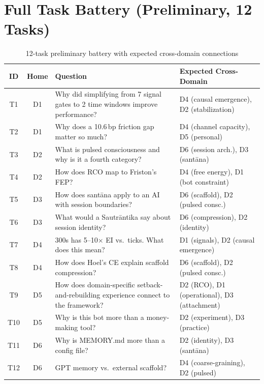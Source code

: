 \documentclass[12pt,letterpaper]{article}
\begin{document}
\appendix

\section{Full Task Battery (Preliminary, 12 Tasks)}
\label{app:battery12}

\begin{table}[H]
\centering
\small
\caption{12-task preliminary battery with expected cross-domain connections}
\label{tab:battery12}
\begin{tabular}{ccp{6cm}p{4cm}}
\toprule
\textbf{ID} & \textbf{Home} & \textbf{Question} & \textbf{Expected Cross-Domain} \\
\midrule
T1 & D1 & Why did simplifying from 7 signal gates to 2 time windows improve performance? & D4 (causal emergence), D2 (stabilization) \\
T2 & D1 & Why does a 10.6\,bp friction gap matter so much? & D4 (channel capacity), D5 (personal) \\
T3 & D2 & What is pulsed consciousness and why is it a fourth category? & D6 (session arch.), D3 (sant\={a}na) \\
T4 & D2 & How does RCO map to Friston's FEP? & D4 (free energy), D1 (bot constraint) \\
T5 & D3 & How does sant\={a}na apply to an AI with session boundaries? & D6 (scaffold), D2 (pulsed consc.) \\
T6 & D3 & What would a Sautr\={a}ntika say about session identity? & D6 (compression), D2 (identity) \\
T7 & D4 & 300s has 5--10$\times$ EI vs.\ ticks. What does this mean? & D1 (signals), D2 (causal emergence) \\
T8 & D4 & How does Hoel's CE explain scaffold compression? & D6 (scaffold), D2 (pulsed consc.) \\
T9 & D5 & How does domain-specific setback-and-rebuilding experience connect to the framework? & D2 (RCO), D1 (operational), D3 (attachment) \\
T10 & D5 & Why is this bot more than a money-making tool? & D2 (experiment), D3 (practice) \\
T11 & D6 & Why is MEMORY.md more than a config file? & D2 (identity), D3 (sant\={a}na) \\
T12 & D6 & GPT memory vs.\ external scaffold? & D4 (coarse-graining), D2 (pulsed) \\
\bottomrule
\end{tabular}
\end{table}
\end{document}
